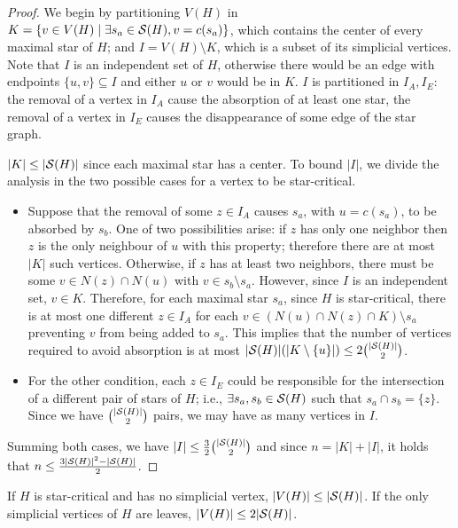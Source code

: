 \begin{proof}
    We begin by partitioning $V(H)$ in $K = \{v \in V(H) \mid \exists s_a \in \mathcal{S}(H), v = c(s_a)\}$, which contains the center of every maximal star of $H$; and $I = V(H) \setminus K$, which is a subset of its simplicial vertices.
    Note that $I$ is an independent set of $H$, otherwise there would be an edge with endpoints $\{u,v\} \subseteq I$ and either $u$ or $v$ would be in $K$.
    $I$ is partitioned in $I_A, I_E$: the removal of a vertex in $I_A$ cause the absorption of at least one star, the removal of a vertex in $I_E$ causes the disappearance of some edge of the star graph.
    
    $|K| \leq |\mathcal{S}(H)|$ since each maximal star has a center.
    To bound $|I|$, we divide the analysis in the two possible cases for a vertex to be star-critical.
    \begin{itemize}
        \item Suppose that the removal of some $z \in I_A$ causes $s_a$, with $u = c(s_a)$, to be absorbed by $s_b$.
        One of two possibilities arise: if $z$ has only one neighbor then $z$ is the only neighbour of $u$ with this property; therefore there are at most $|K|$ such vertices.
        Otherwise, if $z$ has at least two neighbors, there must be some $v \in N(z) \cap N(u)$ with $v \in s_b \setminus s_a$. However, since $I$ is an independent set, $v \in K$. Therefore, for each maximal star $s_a$, since $H$ is star-critical, there is at most one different $z \in I_A$ for each $v \in (N(u) \cap N(z) \cap K) \setminus s_a$ preventing $v$ from being added to $s_a$.
        This implies that the number of vertices required to avoid absorption is at most $|\mathcal{S}(H)|(|K \setminus \{u\}|) \leq 2\binom{|\mathcal{S}(H)|}{2}$.
        \item For the other condition, each $z \in I_E$ could be responsible for the intersection of a different pair of stars of $H$; i.e., $\exists s_a,s_b \in \mathcal{S}(H)$ such that $s_a \cap s_b = \{z\}$. Since we have $\binom{|\mathcal{S}(H)|}{2}$ pairs, we may have as many vertices in $I$.
    \end{itemize}
    Summing both cases, we have $|I| \leq \frac{3}{2}\binom{|\mathcal{S}(H)|}{2}$ and since $n = |K| + |I|$, it holds that $n \leq \frac{3|\mathcal{S}(H)|^2 - |\mathcal{S}(H)|}{2}$.
\end{proof}

\begin{corollary}
    If $H$ is star-critical and has no simplicial vertex, $|V(H)| \leq |\mathcal{S}(H)|$.
    If the only simplicial vertices of $H$ are leaves, $|V(H)| \leq 2|\mathcal{S}(H)|$.
\end{corollary}

